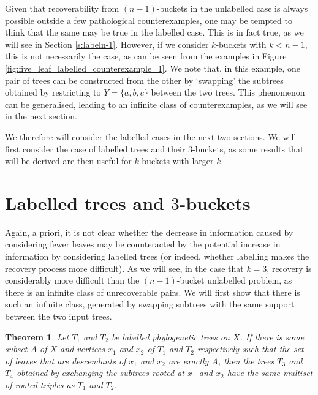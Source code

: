 \documentclass[12pt]{article}
\newtheorem{Theorem}{Theorem}[section]
\theoremstyle{definition}
\begin{document}
Given that recoverability from $(n-1)$-buckets in the unlabelled case is always possible outside a few pathological counterexamples, one may be tempted to think that the same may be true in the labelled case. This is in fact true, as we will see in Section \ref{s:labeln-1}. However, if we consider $k$-buckets with $k < n-1$, this is not necessarily the case, as can be seen from the examples in Figure \ref{fig:five_leaf_labelled_counterexample_1}. We note that, in this example, one pair of trees can be constructed from the other by `swapping' the subtrees obtained by restricting to $Y = \{a,b,c\}$ between the two trees. This phenomenon can be generalised, leading to an infinite class of counterexamples, as we will see in the next section.

We therefore will consider the labelled cases in the next two sections. We will first consider the case of labelled trees and their $3$-buckets, as some results that will be derived are then useful for $k$-buckets with larger $k$.


\section{Labelled trees and \texorpdfstring{$3$}{3}-buckets}\label{s:label3}

Again, a priori, it is not clear whether the decrease in information caused by considering fewer leaves may be counteracted by the potential increase in information by considering labelled trees (or indeed, whether labelling makes the recovery process more difficult). As we will see, in the case that $k=3$, recovery is considerably more difficult than the $(n-1)$-bucket unlabelled problem, as there is an infinite class of unrecoverable pairs. We will first show that there is such an infinite class, generated by swapping subtrees with the same support between the two input trees.

\begin{Theorem}
    Let $T_1$ and $T_2$ be labelled phylogenetic trees on $X$. If there is some subset $A$ of $X$ and vertices $x_1$ and $x_2$ of $T_1$ and $T_2$ respectively such that the set of leaves that are descendants of $x_1$ and $x_2$ are exactly $A$, then the trees $T_3$ and $T_4$ obtained by exchanging the subtrees rooted at $x_1$ and $x_2$ have the same multiset of rooted triples as $T_1$ and $T_2$.
\end{Theorem}
\end{document}
